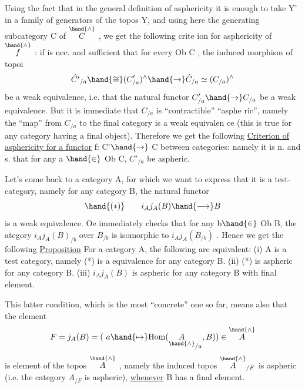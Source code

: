 Using the fact that in the  general definition of asphericity
it is enough to take Y' in a family of generators of the topos Y,  and 
using here the generating subcategory C of $\overset{\hand{\wedge}}{C}$ ,  we get the following crite
ion for asphericity of $\overset{\hand{\wedge}}{f}$ :  if is nec. and sufficient that for every
Ob C ,  the induced morphism of topoi
\[ \hat{C'}_{/a} \hand{\cong} (C'_{/a})^{\wedge} \hand{\to} \hat{C}_{/a} \simeq (C_{/a})^{\wedge} \]
be a weak equivalence,  i.e. that the natural functor  $C'_{/a}\hand{\to} C_{/a}$ be a weak
equivalence.  But it is immediate that $C_{/a}$ is ``contractible''   ``asphe
ric'',  namely the ``map'' from $C_{/a}$ to the final category is a weak equivalen
ce (this is true for any category having a final object). Therefore we get
the following
\margin{||}\uline{Criterion of asphericity for a functor} f: C'$\hand{\to}$ C  between categories:
namely it is n. and s. that for any a $\hand{\in}$ Ob C,   $C'_{/a}$  be aspheric.

Let's come back to a  category A,  for which we want to express
that it is a test-category,  namely for any \inserted{[small]} category B,  the natural
functor
\[ \hand{(*)} \qquad i_Aj_A(B) \hand{\longrightarrow} B \]
is a weak equivalence.  Oe immediately checks that for any b$\hand{\in}$ Ob B,
the ategory  $i_Aj_A(B)_{/b}$  over $B_{/b}$  is isomorphic to $i_Aj_A(B_{/b})$ . Hence
we get the following
\uline{Proposition}  For a \inserted{[small]} category A,  the following are equivalent:
(i)  A is a test category,  namely (*) is a  equivalence for any \inserted{[small]}
category B.
(ii)  (*) is aspheric for any \inserted{[small]} category B.
(iii)  $i_Aj_A(B)$ is aspheric for any category B with final element.

This latter condition,  which is the most ``concrete'' one so far,
means also that the element
\[ F = j_A(B) = (\ a \hand{\mapsto} \mathrm{Hom}(\underset{\hand{\wedge}}{A}_{/a},B)) \in \overset{\hand{\wedge}}{A} \]
is    element of the topos $\overset{\hand{\wedge}}{A}$ ,  namely  the induced topos $\overset{\hand{\wedge}}{A}_{/F}$ is
aspheric (i.e. the category $A_{/F}$  is aspheric),  \uline{whenever} B has a final
element.


